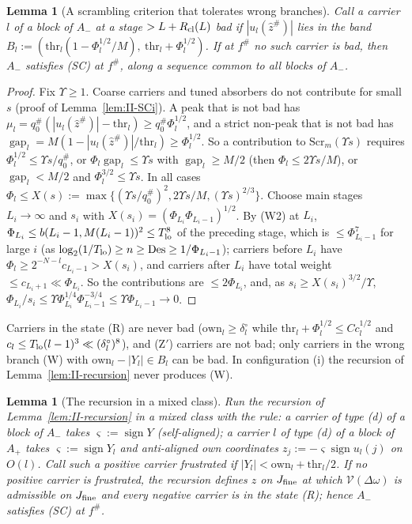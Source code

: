 \documentclass[10pt]{amsart}
\newtheorem{lemma}[theorem]{Lemma}
\theoremstyle{definition}
\theoremstyle{remark}
\newcommand{\sgn}{\operatorname{sign}}
\newcommand{\gap}{\operatorname{gap}}
\newcommand{\zh}{\hat z}
\begin{document}
\begin{lemma}[A scrambling criterion that tolerates wrong branches]\label{lem:II-SCband}
Call a carrier $l$ of a block of $A_-$ at a stage $>L+R_{\rm cl}(L)$ \emph{bad} if
$|u_l(\zh^\#)|$ lies in the band $B_l:=(\mathrm{thr}_l(1-\Phi_l^{1/2}/M),\ \mathrm{thr}_l+\Phi_l^{1/2})$.
If at $f^\#$ no such carrier is bad, then $A_-$ satisfies \textup{(SC)} at $f^\#$, along a
sequence common to all blocks of $A_-$.
\end{lemma}

\begin{proof}
Fix $\Upsilon\ge1$.  Coarse carriers and tuned absorbers do not contribute for small
$s$ (proof of Lemma~\ref{lem:II-SCi}).  A peak that is not bad has
$\mu_l=q^\#_0(|u_l(\zh^\#)|-\mathrm{thr}_l)\ge q^\#_0\Phi_l^{1/2}$, and a strict non-peak that is not
bad has $\gap_l=M(1-|u_l(\zh^\#)|/\mathrm{thr}_l)\ge\Phi_l^{1/2}$.  So a contribution to
$\mathrm{Scr}_m(\Upsilon s)$ requires $\Phi_l^{1/2}\le\Upsilon s/q^\#_0$, or
$\Phi_l\gap_l\le\Upsilon s$ with $\gap_l\ge M/2$ (then $\Phi_l\le2\Upsilon s/M$), or $\gap_l<M/2$ and
$\Phi_l^{3/2}\le\Upsilon s$.  In all cases $\Phi_l\le X(s):=\max\{(\Upsilon s/q^\#_0)^2,2\Upsilon s/M,(\Upsilon s)^{2/3}\}$.
Choose main stages $L_i\to\infty$ and $s_i$ with $X(s_i)=(\Phi_{L_i}\Phi_{L_i-1})^{1/2}$.  By (W2)
at $L_i$, $\Phi_{L_i}\le b(L_i-1,M(L_i-1))^2\le T_{\rm lo}^8$ of the preceding stage, which is
$\le\Phi_{L_i-1}^7$ for large $i$ (as $\log_2(1/T_{\rm lo})\ge n\ge\mathrm{Des}\ge1/\Phi_{L_i-1}$);
carriers before $L_i$ have $\Phi_l\ge2^{-N-l}c_{L_i-1}>X(s_i)$, and carriers after $L_i$ have
total weight $\le c_{L_i+1}\ll\Phi_{L_i}$.  So the contributions are $\le2\Phi_{L_i}$, and,
as $s_i\ge X(s_i)^{3/2}/\Upsilon$, $\Phi_{L_i}/s_i\le\Upsilon\Phi_{L_i}^{1/4}\Phi_{L_i-1}^{-3/4}\le\Upsilon\Phi_{L_i-1}\to
0$.
\end{proof}

Carriers in the state (R) are never bad ($\mathrm{own}_l\ge\delta^\circ_l$ while $\mathrm{thr}_l+
\Phi_l^{1/2}\le Cc_l^{1/2}$ and $c_l\le T_{\rm lo}(l-1)^3\ll(\delta^\circ_l)^8$), and (Z$'$) carriers are
not bad; only carriers in the wrong branch (W) with $\mathrm{own}_l-|Y_l|\in B_l$ can be bad.
In configuration (i) the recursion of Lemma~\ref{lem:II-recursion} never produces (W).

\begin{lemma}[The recursion in a mixed class]\label{lem:II-mixed}
Run the recursion of Lemma~\textup{\ref{lem:II-recursion}} in a mixed class with the
rule: a carrier of type \textup{(d)} of a block of $A_-$ takes $\varsigma:=\sgn Y$
\textup{(}self-aligned\textup{)}; a carrier $l$ of type \textup{(d)} of a block of $A_+$ takes
$\varsigma:=\sgn Y_l$ and anti-aligned own coordinates $z_j:=-\varsigma\sgn u_l(j)$ on $O(l)$.
Call such a positive carrier \emph{frustrated} if $|Y_l|<\mathrm{own}_l+\mathrm{thr}_l/2$.  If no
positive carrier is frustrated, the recursion defines $z$ on $J_{\rm fine}$ at which
$\mathcal V(\Delta\omega)$ is admissible on $J_{\rm fine}$ and every negative carrier is in the
state \textup{(R)}; hence $A_-$ satisfies \textup{(SC)} at $f^\#$.
\end{lemma}
\end{document}
